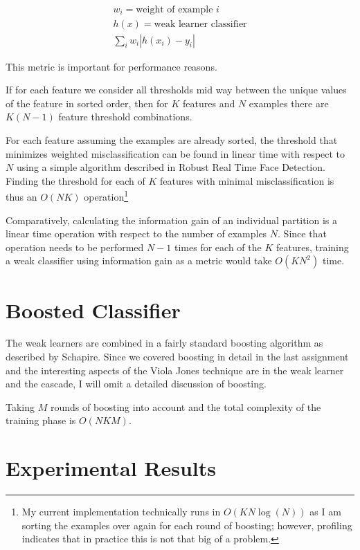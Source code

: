 \documentclass[11pt,twocolumn]{article}
\begin{document}
\begin{align*}
  w_i = \mbox{weight of example $i$}\\
  h(x) = \mbox{weak learner classifier}\\
  \sum_i w_i |h(x_i) - y_i|
\end{align*}

This metric is important for performance reasons.

If for each feature we consider all thresholds mid way between the
unique values of the feature in sorted order, then for $K$ features and
$N$ examples there are $K (N - 1)$ feature threshold combinations.

For each feature assuming the examples are already sorted, the
threshold that minimizes weighted misclassification can be found in
linear time with respect to $N$ using a simple algorithm described in
Robust Real Time Face Detection\cite{violajones2004}. Finding the
threshold for each of $K$ features with minimal misclassification is
thus an $O(N K)$ operation\footnote{My current implementation
  technically runs in $O(K N \log(N))$ as I am sorting the examples
  over again for each round of boosting; however, profiling indicates
  that in practice this is not that big of a problem.}

Comparatively, calculating the information gain of an individual
partition is a linear time operation with respect to the number of
examples $N$. Since that operation needs to be performed $N - 1$ times
for each of the $K$ features, training a weak classifier using
information gain as a metric would take $O(K N^2)$ time.

\section{Boosted Classifier}
\label{sec:boosting}

The weak learners are combined in a fairly standard boosting algorithm
as described by Schapire\cite{schapire2001}. Since we covered boosting
in detail in the last assignment and the interesting aspects of the
Viola Jones technique are in the weak learner and the cascade, I will
omit a detailed discussion of boosting.

Taking $M$ rounds of boosting into account and the total complexity of
the training phase is $O(N K M)$.

\section{Experimental Results}
\end{document}
